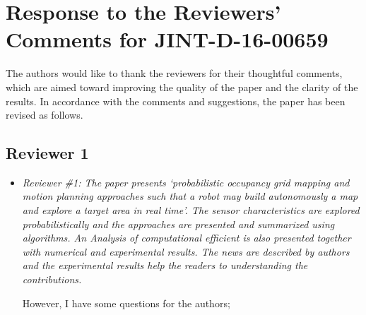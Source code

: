 \documentclass[11pt]{article}
\begin{document}

\section*{Response to the Reviewers' Comments for JINT-D-16-00659}

The authors would like to thank the reviewers for their thoughtful comments, which are aimed toward improving the quality of the paper and the clarity of the results. In accordance with the comments and suggestions, the paper has been revised as follows. 

\subsection*{Reviewer 1}

\setlength{\leftmargini}{0pt}
\begin{itemize}\setlength{\itemsep}{2\parsep}

\item {\itshape Reviewer \#1: The paper presents `probabilistic occupancy grid mapping and motion planning approaches such that a robot may build autonomously a map and explore a target area  in real time'. The sensor characteristics are explored probabilistically and the approaches are presented and summarized using algorithms. An Analysis of  computational efficient  is also presented together with numerical and experimental results. The news are described by authors and the experimental results help the readers to understanding the contributions.

However, I have some questions for the authors;}
\end{itemize}

\end{document}
